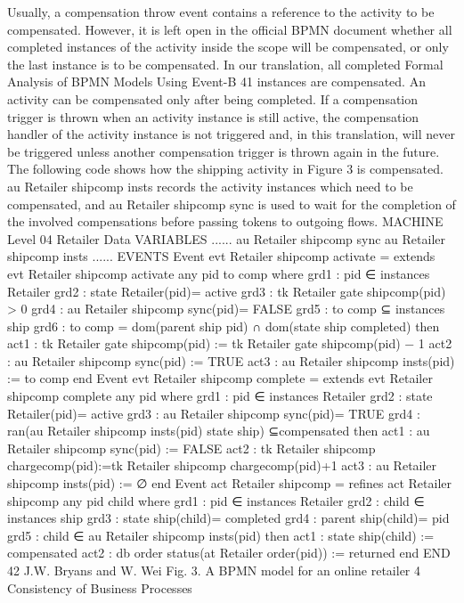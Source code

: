 Usually, a compensation throw event contains a reference to the activity to be
compensated. However, it is left open in the official BPMN document whether
all completed instances of the activity inside the scope will be compensated, or
only the last instance is to be compensated. In our translation, all completed
Formal Analysis of BPMN Models Using Event-B 41
instances are compensated. An activity can be compensated only after being
completed. If a compensation trigger is thrown when an activity instance is still
active, the compensation handler of the activity instance is not triggered and,
in this translation, will never be triggered unless another compensation trigger
is thrown again in the future.
The following code shows how the shipping activity in Figure 3 is compensated. au Retailer shipcomp insts records the activity instances which need
to be compensated, and au Retailer shipcomp sync is used to wait for the
completion of the involved compensations before passing tokens to outgoing
flows.
MACHINE Level 04 Retailer Data
VARIABLES
......
au Retailer shipcomp sync
au Retailer shipcomp insts
......
EVENTS
Event evt Retailer shipcomp activate = extends evt Retailer shipcomp activate
any
pid
to comp
where
grd1 : pid ∈ instances Retailer
grd2 : state Retailer(pid)= active
grd3 : tk Retailer gate shipcomp(pid) > 0
grd4 : au Retailer shipcomp sync(pid)= FALSE
grd5 : to comp ⊆ instances ship
grd6 : to comp = dom(parent ship  {pid}) ∩ dom(state ship  {completed})
then
act1 : tk Retailer gate shipcomp(pid) := tk Retailer gate shipcomp(pid) − 1
act2 : au Retailer shipcomp sync(pid) := TRUE
act3 : au Retailer shipcomp insts(pid) := to comp end
Event evt Retailer shipcomp complete = extends evt Retailer shipcomp complete
any
pid
where
grd1 : pid ∈ instances Retailer
grd2 : state Retailer(pid)= active
grd3 : au Retailer shipcomp sync(pid)= TRUE
grd4 : ran(au Retailer shipcomp insts(pid)  state ship) ⊆{compensated}
then
act1 : au Retailer shipcomp sync(pid) := FALSE
act2 : tk Retailer shipcomp chargecomp(pid):=tk Retailer shipcomp chargecomp(pid)+1
act3 : au Retailer shipcomp insts(pid) := ∅
end
Event act Retailer shipcomp = refines act Retailer shipcomp
any
pid
child
where
grd1 : pid ∈ instances Retailer
grd2 : child ∈ instances ship
grd3 : state ship(child)= completed
grd4 : parent ship(child)= pid
grd5 : child ∈ au Retailer shipcomp insts(pid)
then
act1 : state ship(child) := compensated
act2 : db order status(at Retailer order(pid)) := returned
end
END
42 J.W. Bryans and W. Wei
Fig. 3. A BPMN model for an online retailer
4 Consistency of Business Processes

